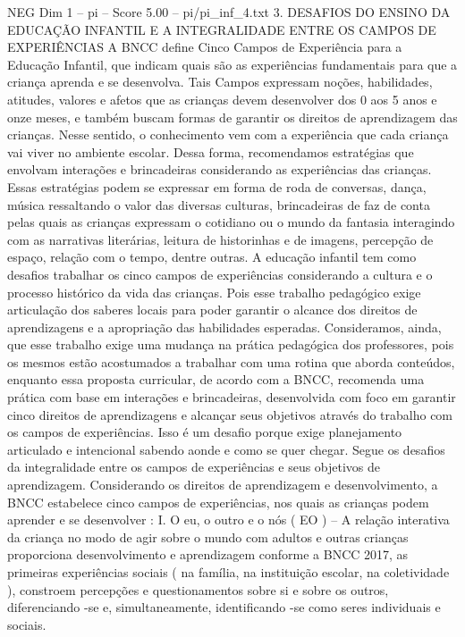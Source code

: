 \begin{textsample}{NEG Dim 1 – pi – Score 5.00 – pi/pi\_inf\_4.txt}  \label{ex:f1_neg_238}
3.
DESAFIOS DO ENSINO DA EDUCAÇÃO INFANTIL E A INTEGRALIDADE ENTRE OS CAMPOS DE EXPERIÊNCIAS A BNCC define Cinco Campos de Experiência para a Educação Infantil, que indicam quais são as experiências fundamentais para que a criança aprenda e se desenvolva.
Tais Campos expressam noções, habilidades, atitudes, valores e afetos que as crianças devem desenvolver dos 0 aos 5 anos e onze meses, e também buscam formas de garantir os direitos de aprendizagem das crianças.
Nesse sentido, o conhecimento vem com a experiência que cada criança vai viver no ambiente escolar.
Dessa forma, recomendamos estratégias que envolvam interações e brincadeiras considerando as experiências das crianças.
Essas estratégias podem se expressar em forma de roda de conversas, dança, música ressaltando o valor das diversas culturas, brincadeiras de faz de conta pelas quais as crianças expressam o cotidiano ou o mundo da fantasia interagindo com as narrativas literárias, leitura de historinhas e de imagens, percepção de espaço, relação com o tempo, dentre outras.
A educação infantil tem como desafios trabalhar os cinco campos de experiências considerando a cultura e o processo histórico da vida das crianças.
Pois esse trabalho pedagógico exige articulação dos saberes locais para poder garantir o alcance dos direitos de aprendizagens e a apropriação das habilidades esperadas.
Consideramos, ainda, que esse trabalho exige uma mudança na prática pedagógica dos professores, pois os mesmos estão acostumados a trabalhar com uma rotina que aborda conteúdos, enquanto essa proposta curricular, de acordo com a BNCC, recomenda uma prática com base em interações e brincadeiras, desenvolvida com foco em garantir cinco direitos de aprendizagens e alcançar seus objetivos através do trabalho com os campos de experiências.
Isso é um desafio porque exige planejamento articulado e intencional sabendo aonde e como se quer chegar.
Segue os desafios da integralidade entre os campos de experiências e seus objetivos de aprendizagem.
Considerando os direitos de aprendizagem e desenvolvimento, a BNCC estabelece cinco campos de experiências, nos quais as crianças podem aprender e se desenvolver : I.
O eu, o outro e o nós ( EO ) – A relação interativa da criança no modo de agir sobre o mundo com adultos e outras crianças proporciona desenvolvimento e aprendizagem conforme a BNCC 2017, as primeiras experiências sociais ( na família, na instituição escolar, na coletividade ), constroem percepções e questionamentos sobre si e sobre os outros, diferenciando -se e, simultaneamente, identificando -se como seres individuais e sociais.

\end{textsample}
